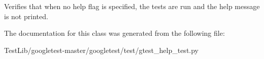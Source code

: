 \begin{DoxyVerb}Verifies that when no help flag is specified, the tests are run
and the help message is not printed.\end{DoxyVerb}
 

The documentation for this class was generated from the following file\+:\begin{DoxyCompactItemize}
\item 
Test\+Lib/googletest-\/master/googletest/test/gtest\+\_\+help\+\_\+test.\+py\end{DoxyCompactItemize}
